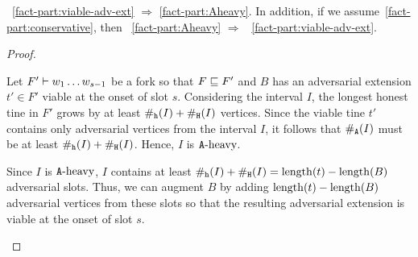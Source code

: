     \begin{proposition}[]\label{prop:fork-structure}
    ~\ref{fact-part:viable-adv-ext} $\Longrightarrow$
    \ref{fact-part:Aheavy}.
    In addition, if we assume~\ref{fact-part:conservative}, then 
    ~\ref{fact-part:Aheavy} $\Longrightarrow$ 
    ~\ref{fact-part:viable-adv-ext}.
    \end{proposition}

    \begin{proof}~
      \begin{description}[font=\normalfont\itshape\space]
        \item[\ref{fact-part:viable-adv-ext} implies~\ref{fact-part:Aheavy}.]
        Let $F' \vdash w_1 \ldots w_{s-1}$ be 
        a fork so that $F \sqsubseteq F'$ 
        and $B$ has an adversarial extension $t' \in F'$ 
        viable at the onset of slot $s$. 
        Considering the interval $I$, 
        the longest honest tine in $F'$ 
        grows by at least $\#_{\mathtt{h}}(I) + \#_{\mathtt{H}}(I)$ vertices. 
        Since the viable tine $t'$ 
        contains only adversarial vertices from the interval $I$, 
        it follows that $\#_{\mathtt{A}}(I)$ must be at least $\#_{\mathtt{h}}(I) + \#_{\mathtt{H}}(I)$. 
        Hence, $I$ is $\mathtt{A}\text{-heavy}$.

        \item[\ref{fact-part:conservative} and \ref{fact-part:Aheavy} implies~\ref{fact-part:viable-adv-ext}.]
        Since $I$ is $\mathtt{A}\text{-heavy}$,  
        $I$ contains at least $\#_{\mathtt{h}}(I) + \#_{\mathtt{H}}(I) = \operatorname{length}(t) - \operatorname{length}(B)$ 
        adversarial slots. 
        Thus, we can augment $B$ by adding 
        $\operatorname{length}(t) - \operatorname{length}(B)$ adversarial vertices 
        from these slots 
        so that 
        the resulting adversarial extension is viable 
        at the onset of slot $s$.
      \end{description}
    \end{proof}






